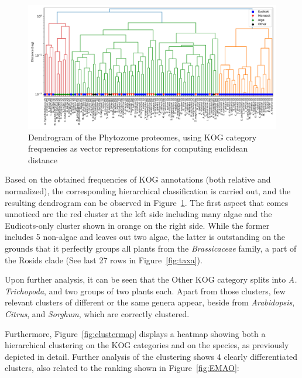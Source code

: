\begin{figure}[htp!]
\centering
\includegraphics[width=1.05\textwidth]{figures/dendrogram_ward}
\caption{Dendrogram of the Phytozome proteomes, using KOG 
category frequencies as vector representations for 
computing euclidean distance}
\label{fig:dendrogram}
\end{figure}

Based on the obtained frequencies of KOG annotations (both 
relative and normalized), the corresponding hierarchical 
classification is carried out, and the resulting 
dendrogram can be observed in Figure~\ref{fig:dendrogram}.
The first aspect that comes unnoticed are the red cluster at 
the left side including many algae and the 
Eudicots-only cluster shown in orange on the right side. 
While the former includes 5 non-algae and leaves out 
two algae, the latter is outstanding on the grounds 
that it perfectly groups all plants from the 
\emph{Brassicaceae} family, a part of the Rosids clade (See 
last 27 rows in Figure~\ref{fig:taxa}).

Upon further analysis, it can be seen that the Other KOG 
category splits into \emph{A. Trichopoda}, and two groups 
of two plants each. Apart from those clusters, few relevant 
clusters of different or the same genera appear, beside from 
\emph{Arabidopsis}, \emph{Citrus}, and \emph{Sorghum}, which 
are correctly clustered.

Furthermore, Figure~\ref{fig:clustermap} displays a 
heatmap showing both a hierarchical clustering on the KOG 
categories and on the species, as previously depicted 
in detail. Further analysis of the clustering shows 4 clearly 
differentiated clusters, also related to the ranking shown in 
Figure~\ref{fig:EMAO}:

